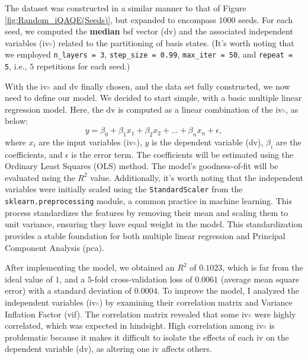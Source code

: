 The dataset was constructed in a similar manner to that of Figure \ref{fig:Random_iQAQE(Seeds)}, but expanded to encompass $1000$ seeds. For each seed, we computed the \textbf{median} \acrshort{bsf} vector (\acrshort{dv}) and the associated independent variables (\acrshort{iv}\textcolor{gray}{s}) related to the partitioning of basis states. (It's worth noting that we employed \texttt{n\_layers = 3}, \texttt{step\_size = 0.99}, \texttt{max\_iter = 50}, and \texttt{repeat = 5}, i.e., $5$ repetitions for each seed.)

With the \acrshort{iv}\textcolor{gray}{s} and \acrshort{dv} finally chosen, and the data set fully constructed, we now need to define our model. We decided to start simple, with a basic multiple linear regression model. Here, the \acrshort{dv} is computed as a linear combination of the \acrshort{iv}\textcolor{gray}{s}, as below:
\begin{equation}
    y = \beta_0 + \beta_1 x_1 + \beta_2 x_2 + \ldots + \beta_n x_n + \epsilon,
\end{equation}
where $x_i$ are the input variables (\acrshort{iv}\textcolor{gray}{s}), $y$ is the dependent variable (\acrshort{dv}), $\beta_i$ are the coefficients, and $\epsilon$ is the error term. The coefficients will be estimated using the Ordinary Least Squares (OLS) method. The model's goodness-of-fit will be evaluated using the $R^2$ value. Additionally, it's worth noting that the independent variables were initially scaled using the \texttt{StandardScaler} from the \texttt{sklearn.preprocessing} module, a common practice in machine learning. This process standardizes the features by removing their mean and scaling them to unit variance, ensuring they have equal weight in the model. This standardization provides a stable foundation for both multiple linear regression and Principal Component Analysis (\acrshort{pca}).

After implementing the model, we obtained an $R^2$ of $0.1023$, which is far from the ideal value of $1$, and a $5$-fold cross-validation loss of $0.0061$ (average mean square error) with a standard deviation of $0.0004$. To improve the model, I analyzed the independent variables (\acrshort{iv}\textcolor{gray}{s}) by examining their correlation matrix and Variance Inflation Factor (\acrshort{vif}). The correlation matrix revealed that some \acrshort{iv}\textcolor{gray}{s} were highly correlated, which was expected in hindsight. High correlation among \acrshort{iv}\textcolor{gray}{s} is problematic because it makes it difficult to isolate the effects of each \acrshort{iv} on the dependent variable (\acrshort{dv}), as altering one \acrshort{iv} affects others.

